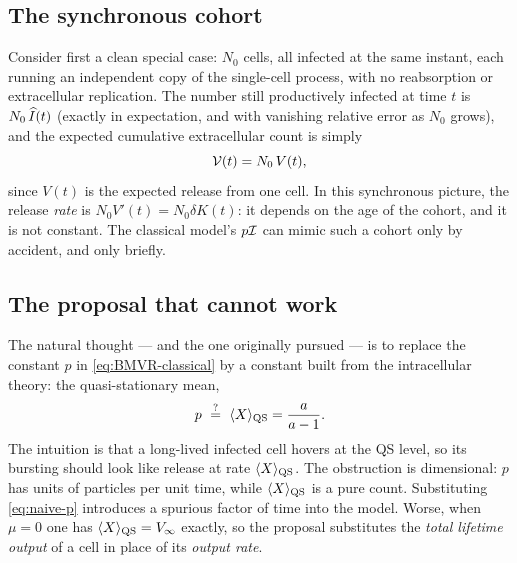 \subsection{The synchronous cohort}
\label{sec:sync-cohort}

Consider first a clean special case: $N_0$ cells, all infected at the same
instant, each running an independent copy of the single-cell process, with
no reabsorption or extracellular replication. The number still productively
infected at time $t$ is $N_0\,\widehat{I}(t)$ (exactly in expectation, and with
vanishing relative error as $N_0$ grows), and the expected cumulative
extracellular count is simply
\begin{equation}
\mathcal{V}(t)=N_0\,V(t),
\end{equation}
since $V(t)$ is the expected release from one cell. In this synchronous
picture, the release \emph{rate} is $N_0 V'(t)=N_0\delta K(t)$: it depends
on the age of the cohort, and it is not constant. The classical model's
$p\mathcal{I}$ can mimic such a cohort only by accident, and only briefly.

\subsection{The proposal that cannot work}
\label{sec:proposal-fails}

The natural thought --- and the one originally pursued --- is to replace the
constant $p$ in \eqref{eq:BMVR-classical} by a constant built from the
intracellular theory: the quasi-stationary mean,
\begin{equation}
p\ \stackrel{?}{=}\ \langle X\rangle_{\rm QS}=\frac{a}{a-1}.
\label{eq:naive-p}
\end{equation}
The intuition is that a long-lived infected cell hovers at the QS level, so
its bursting should look like release at rate $\langle X\rangle_{\rm QS}$.
The obstruction is dimensional: $p$ has units of particles per unit time,
while $\langle X\rangle_{\rm QS}$ is a pure count. Substituting
\eqref{eq:naive-p} introduces a spurious factor of time into the model.
Worse, when $\mu=0$ one has $\langle X\rangle_{\rm QS}=V_\infty$ exactly, so
the proposal substitutes the \emph{total lifetime output} of a cell in place
of its \emph{output rate}.

